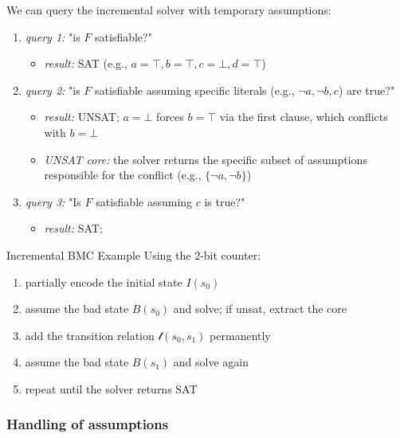 \documentclass[a4paper, 11pt]{report}
\begin{document}
We can query the incremental solver with temporary assumptions:
\begin{enumerate}
    \item \textit{query 1:} "is $F$ satisfiable?"
    \begin{itemize}
        \item \textit{result:} SAT (e.g., $a=\top, b=\top, c=\bot, d=\top$)
    \end{itemize}
    
    \item \textit{query 2:} "is $F$ satisfiable assuming specific literals (e.g., $\neg a, \neg b, c$) are true?"
    \begin{itemize}
        \item \textit{result:} UNSAT; $a=\bot$ forces $b=\top$ via the first clause, which conflicts with $b=\bot$
        \item \textit{UNSAT core:} the solver returns the specific subset of assumptions responsible for the conflict (e.g., $\{\neg a, \neg b\}$)
    \end{itemize}
    
\item \textit{query 3:} "Is $F$ satisfiable assuming $c$ is true?"
    \begin{itemize}
        \item \textit{result:} SAT;
    \end{itemize}
\end{enumerate}


\begin{gframe}{Incremental BMC Example}
Using the 2-bit counter:
\begin{enumerate}
    \item partially encode the initial state $I(s_0)$
    \item assume the bad state $B(s_0)$ and solve; if unsat, extract the core
    \item add the transition relation $\mathcal{t}(s_0, s_1)$ permanently
    \item assume the bad state $B(s_1)$ and solve again
    \item repeat until the solver returns SAT
\end{enumerate}
\end{gframe}

\subsubsection{Handling of assumptions}
\end{document}
